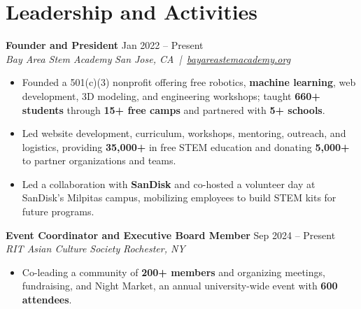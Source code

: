 \documentclass[10pt,letterpaper]{article}
\newif\ifresumeFirstRole
\newcommand{\resumeRole}[4]{%
  \ifresumeFirstRole
    \global\resumeFirstRolefalse
  \else
    \vspace{0pt plus 1fill}%
  \fi
  \textbf{#1} \hfill #2\\
  \textit{#3} \hfill \textit{#4}
}
\begin{document}
\section*{Leadership and Activities}
\resumeRole{Founder and President}{Jan 2022 -- Present}{Bay Area Stem Academy}{San Jose, CA \,|\, \href{https://bayareastemacademy.org}{bayareastemacademy.org}}
\begin{itemize}
  \item Founded a 501(c)(3) nonprofit offering free robotics, \textbf{machine learning}, web development, 3D modeling, and engineering workshops; taught \textbf{660+ students} through \textbf{15+ free camps} and partnered with \textbf{5+ schools}.
  \item Led website development, curriculum, workshops, mentoring, outreach, and logistics, providing \textbf{\textdollar{}35,000+} in free STEM education and donating \textbf{\textdollar{}5,000+} to partner organizations and teams.
  \item Led a collaboration with \textbf{SanDisk} and co-hosted a volunteer day at SanDisk's Milpitas campus, mobilizing employees to build STEM kits for future programs.
\end{itemize}

\resumeRole{Event Coordinator and Executive Board Member}{Sep 2024 -- Present}{RIT Asian Culture Society}{Rochester, NY}
\begin{itemize}
  \item Co-leading a community of \textbf{200+ members} and organizing meetings, fundraising, and Night Market, an annual university-wide event with \textbf{600 attendees}.
\end{itemize}
\end{document}
